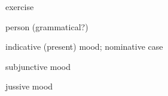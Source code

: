\documentclass[avery5371,grid,frame]{flashcards}
\begin{document}
\begin{flashcard}{\LARGE exercise}
\LARGE {}
\end{flashcard}
\begin{flashcard}{\LARGE person (grammatical?)}
\LARGE {}
\end{flashcard}
\begin{flashcard}{\LARGE indicative (present) mood; nominative case}
\LARGE {}
\end{flashcard}
\begin{flashcard}{\LARGE subjunctive mood}
\LARGE {}
\end{flashcard}
\begin{flashcard}{\LARGE jussive mood}
\LARGE {}
\end{flashcard}
\end{document}
